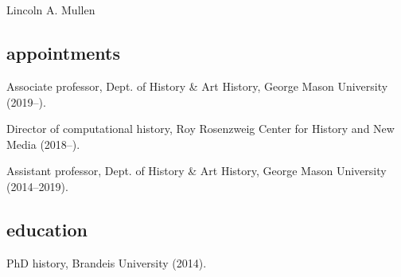 \documentclass[11pt]{article}
\begin{document}
\thispagestyle{fancy}
\fancyfoot{}
\fancyhead{}
\renewcommand{\headrulewidth}{0pt}

\hfill\hfill\hfill
\hfill\hfill\hfill
\hfill\hfill\hfill
\hfill\hfill\hfill
\begin{minipage}[t]{1.6in}
   \\
   \\
\end{minipage}
\hfill
\begin{minipage}[t]{1.9in}
\end{minipage}

\vspace{0.1in}

{\Large Lincoln A. Mullen}\\[-0.1in]

\subsection{appointments}\label{Appointments}

Associate professor, Dept. of History \& Art History, George Mason University (2019--).

Director of computational history, Roy Rosenzweig Center for History and New Media (2018--).

Assistant professor, Dept. of History \& Art History, George Mason University (2014--2019).

\subsection{education}\label{education}

PhD history, Brandeis University (2014). 

\end{document}
